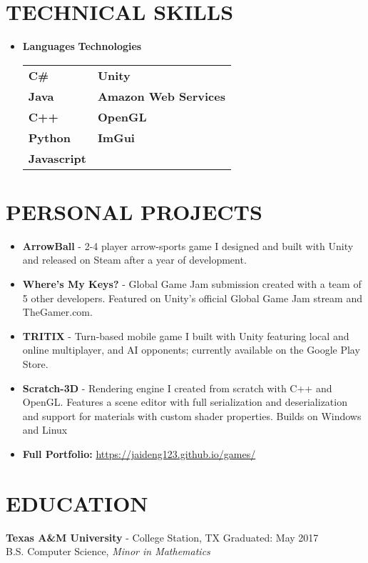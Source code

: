 \documentclass[margin,10pt]{res} %
\begin{document}
\begin{resume}
\section{TECHNICAL SKILLS}	
							\begin{itemize}
                    		\item[] 
\textbf{\large Languages}  \hspace*{.5in} \textbf{\large Technologies}        \\
\begin{tabular}{ll}
\textbf{C\#} \hspace*{1in}  & \textbf{Unity} \\
\textbf{Java} & \textbf{Amazon Web Services} \\
\textbf{C++}   & \textbf{OpenGL}       \\
\textbf{Python}  & \textbf{ImGui}               \\
\textbf{Javascript} &  \\                
\end{tabular}
                    		\end{itemize} 
\section{PERSONAL PROJECTS}
				\begin{itemize}       
				\item \textbf{ArrowBall} - 2-4 player arrow-sports game I designed and built with Unity and released on Steam after a year of development.
                	\item \textbf{Where's My Keys?} - Global Game Jam submission created with a team of 5 other developers. Featured on Unity's official Global Game Jam stream and TheGamer.com.
                	\item \textbf{TRITIX} - Turn-based mobile game I built with Unity featuring local and online multiplayer, and AI opponents; currently available on the Google Play Store.
                	\item \textbf{Scratch-3D} - Rendering engine I created from scratch with C++ and OpenGL. Features a scene editor with full serialization and deserialization and support for materials with custom shader properties. Builds on Windows and Linux
                	\item \textbf{Full Portfolio:} \href{https://jaideng123.github.io/games/}{https://jaideng123.github.io/games/}
                \end{itemize}
                
\section{EDUCATION}
{\bf Texas A\&M University} - College Station, TX \hfill
Graduated: May 2017 \\
B.S. Computer Science,
\textit{Minor in Mathematics}
\end{resume} 
\end{document}

